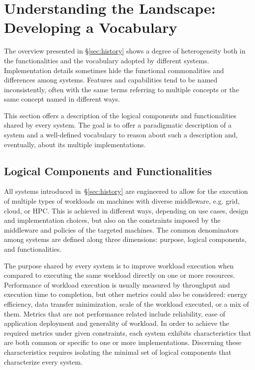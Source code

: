 \documentclass{sig-alternate}
\begin{document}
\section{Understanding the Landscape: Developing a Vocabulary}
\label{sec:understanding}

The overview presented in \S\ref{sec:history} shows a degree of heterogeneity
both in the functionalities and the vocabulary adopted by different \pilotjob
systems. Implementation details sometimes hide the functional commonalities and
differences among \pilotjob systems. Features and capabilities tend to be named
inconsistently, often with the same terms referring to multiple concepts or the
same concept named in different ways.

This section offers a description of the logical components and functionalities
shared by every \pilotjob system. The goal is to offer a paradigmatic
description of a \pilotjob system and a well-defined vocabulary to reason about
such a description and, eventually, about its multiple implementations.


\subsection{Logical Components and Functionalities}
\label{sec:compsandfuncs}

All \pilotjob systems introduced in~\S\ref{sec:history} are engineered to allow
for the execution of multiple types of workloads on machines with diverse
middleware, e.g. grid, cloud, or HPC. This is achieved in different ways,
depending on use cases, design and implementation choices, but also on the
constraints imposed by the middleware and policies of the targeted machines. The
common denominators among \pilotjob systems are defined along three dimensions:
purpose, logical components, and functionalities.

The purpose shared by every \pilotjob system is to improve workload execution when
compared to executing the same workload directly on one or more
resources. Performance of workload execution is usually measured by throughput
and execution time to completion, but other metrics could also be
considered: energy efficiency, data transfer minimization, scale of the workload
executed, or a mix of them. Metrics that are not performance related include
reliability, ease of application deployment and generality of workload.  In
order to achieve the required metrics under given constraints, each \pilotjob
system exhibits characteristics that are both common or specific to one or more
implementations. Discerning these characteristics requires isolating the minimal
set of logical components that characterize every \pilotjob system.
\end{document}
